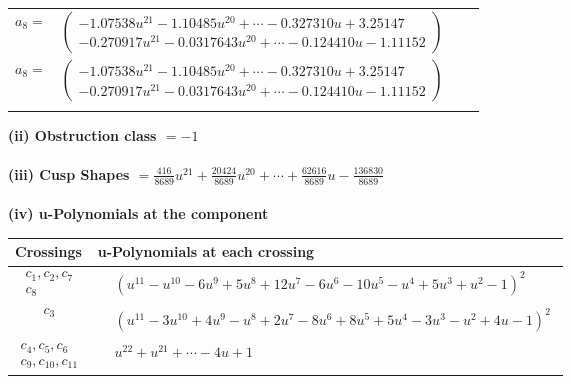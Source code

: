 \documentclass[1p]{elsarticle_modified}
\theoremstyle{definition}
\begin{document}
\begin{tabular}{m{7pt} m{180pt} m{7pt} m{180pt} }
\flushright $a_{8}=$&$\begin{pmatrix}-1.07538 u^{21}-1.10485 u^{20}+\cdots-0.327310 u+3.25147\\-0.270917 u^{21}-0.0317643 u^{20}+\cdots-0.124410 u-1.11152\end{pmatrix}$\\ \flushright $a_{8}=$&$\begin{pmatrix}-1.07538 u^{21}-1.10485 u^{20}+\cdots-0.327310 u+3.25147\\-0.270917 u^{21}-0.0317643 u^{20}+\cdots-0.124410 u-1.11152\end{pmatrix}$\\&\end{tabular}
\flushleft \textbf{(ii) Obstruction class $= -1$}\\~\\
\flushleft \textbf{(iii) Cusp Shapes $= \frac{416}{8689} u^{21}+\frac{20424}{8689} u^{20}+\cdots+\frac{62616}{8689} u-\frac{136830}{8689}$}\\~\\
\newpage\renewcommand{\arraystretch}{1}
\flushleft \textbf{(iv) u-Polynomials at the component}\newline \\
\begin{tabular}{m{50pt}|m{274pt}}
Crossings & \hspace{64pt}u-Polynomials at each crossing \\
\hline $$\begin{aligned}c_{1},c_{2},c_{7}\\c_{8}\end{aligned}$$&$\begin{aligned}
&(u^{11}- u^{10}-6 u^9+5 u^8+12 u^7-6 u^6-10 u^5- u^4+5 u^3+u^2-1)^2
\end{aligned}$\\
\hline $$\begin{aligned}c_{3}\end{aligned}$$&$\begin{aligned}
&(u^{11}-3 u^{10}+4 u^9- u^8+2 u^7-8 u^6+8 u^5+5 u^4-3 u^3- u^2+4 u-1)^2
\end{aligned}$\\
\hline $$\begin{aligned}c_{4},c_{5},c_{6}\\c_{9},c_{10},c_{11}\end{aligned}$$&$\begin{aligned}
&u^{22}+u^{21}+\cdots-4 u+1
\end{aligned}$\\
\hline
\end{tabular}\\~\\
\end{document}
